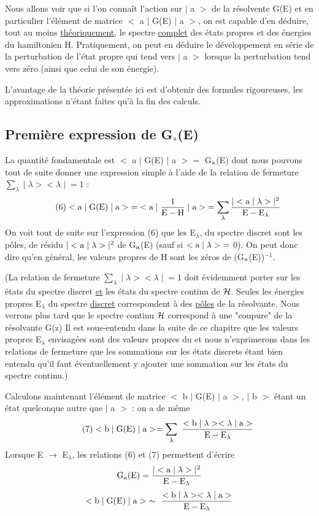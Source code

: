 Nous allons voir que si l'on connaît l'action sur $|$ a $>$ de la résolvente G(E) et en
particulier l'élément de matrice $<$ a $|$ G(E) $|$ a $>$, on est capable
d'en déduire, tout au moins \ul{théoriquement}, le spectre \ul{complet} des états propres
et des énergies du hamiltonien H. Pratiquement, on peut en déduire le développement
en série de la perturbation de l'état propre qui tend vers $|$ a $>$ lorsque
la perturbation tend vers zéro (ainsi que celui de son énergie).

L'avantage de la théorie présentée ici est d'obtenir des formules
rigoureuses, les approximations n'étant faites qu'à la fin des calculs.
\subsection{Première expression de G$_{\text{a}}$(E)}%
La quantité fondamentale est $<$ a $|$ G(E) $|$ a $>=$ G$_{\text{a}}$(E) dont nous pouvons
tout de suite donner une expression simple à l'aide de la relation de fermeture
$\sum_\lambda\;|\;\lambda><\lambda\;|\;=1$ :
\[
\tag{6}<\text{a}\;|\;\text{G(E)}\;|\;\text{a}>\;=\;<\text{a}\;|\;\frac{1}{\text{E}-\text{H}}\;|\;\text{a}>\;=
\sum_\lambda\frac{|<\text{a}\;|\;\lambda>|^2}{\text{E}-\text{E}_\lambda}
\]
On voit tout de suite sur l'expression (6) que les E$_\lambda$, du spectre discret sont les
pôles, de résidu $|<\text{a}\;|\;\lambda>|^2$ de G$_{\text{a}}$(E) (sauf si $<\text{a}\;|\;\lambda>\;=$ 0). On peut
donc dire qu'en général, les valeurs propres de H sont les zéros de (G$_{\text{a}}$(E))$^{-1}$.

{\footnotesize (La relation de fermeture $\sum_\lambda\;|\;\lambda><\lambda\;|\;=1$
doit évidemment porter sur les états du
spectre discret \ul{et} les états du spectre continu de $\mathcal{H}$. Seules les énergies propres
E$_\lambda$ du spectre \ul{discret} correspondent à des \ul{pôles} de la résolvante. Nous verrons plus
tard que le spectre continu $\mathcal{H}$ correspond à une "coupure" de la résolvante G(z)
Il est sous-entendu dans la suite de ce chapitre que les valeurs propres E$_\lambda$ envisagées sont des valeurs
propres du  et nous n'exprimerons dans les relations de fermeture que les sommations sur les 
états discrets étant bien entendu
qu'il faut éventuellement y ajouter une sommation sur les états du spectre continu.)}

Calculons maintenant l'élément de matrice $<$ b $|$ G(E) $|$ a $>$, $|$ b $>$
étant un état quelconque autre que $|$ a $>$ : on a de même
\[
\tag{7}<\mt{b}\;|\;\mt{G(E)}\;|\;\mt{a}>=\sum_\lambda\ \frac{<\mt{b}\;|\;\lambda>
<\lambda\;|\;\mt{a}>}{\mt{E}-\mt{E}_\lambda}
\]
Lorsque E $\to$ E$_\lambda$, les relations (6) et (7) permettent d'écrire
\[
\text{G}_{\text{a}}(\text{E})=\frac{|<\text{a}\;|\;\lambda>|^2}{\text{E}-\text{E}_\lambda}
\]
\[
<\mt{b}\;|\;\mt{G(E)}\;|\;\mt{a}>\ \sim\ \frac{<\mt{b}\;|\;\lambda><\lambda\;|\;\mt{a}>}{\mt{E}-\mt{E}_\lambda}
\]

